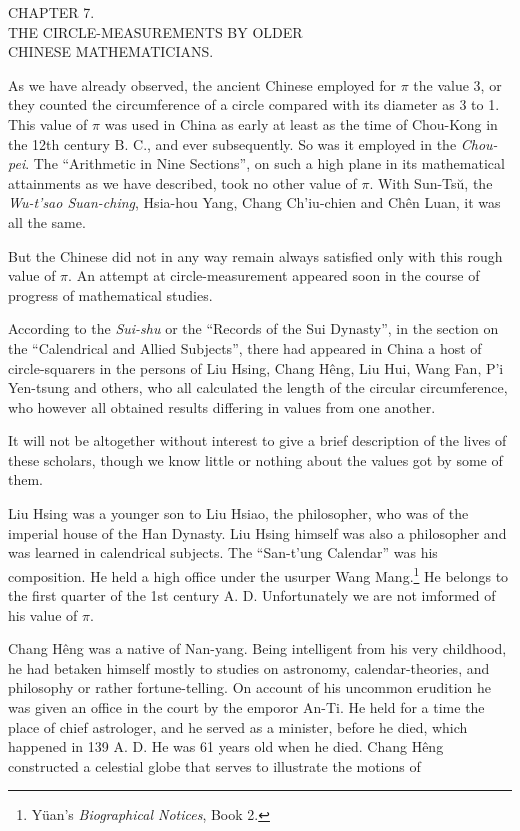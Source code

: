 \documentclass[11pt]{article}
\newcommand{\scanpage}[2]{\clearpage\setcounter{footnote}{0}\noindent{\footnotesize\color{gray}PDF page #1 · #2}\par\medskip}
\newcommand{\scanfooter}{}
\begin{document}
\scanpage{0060}{Chapter 7, printed page 46}
\setcounter{footnote}{0}
\begin{center}
CHAPTER 7.\\
THE CIRCLE-MEASUREMENTS BY OLDER\\
CHINESE MATHEMATICIANS.
\end{center}

As we have already observed, the ancient Chinese employed for $\pi$ the value 3, or they counted the circumference of a circle compared with its diameter as 3 to 1. This value of $\pi$ was used in China as early at least as the time of Chou-Kong in the 12th century B. C., and ever subsequently. So was it employed in the \emph{Chou-pei}. The ``Arithmetic in Nine Sections'', on such a high plane in its mathematical attainments as we have described, took no other value of $\pi$. With Sun-Tsŭ, the \emph{Wu-t'sao Suan-ching}, Hsia-hou Yang, Chang Ch'iu-chien and Chên Luan, it was all the same.

But the Chinese did not in any way remain always satisfied only with this rough value of $\pi$. An attempt at circle-measurement appeared soon in the course of progress of mathematical studies.

According to the \emph{Sui-shu} or the ``Records of the Sui Dynasty'', in the section on the ``Calendrical and Allied Subjects'', there had appeared in China a host of circle-squarers in the persons of Liu Hsing, Chang Hêng, Liu Hui, Wang Fan, P'i Yen-tsung and others, who all calculated the length of the circular circumference, who however all obtained results differing in values from one another.

It will not be altogether without interest to give a brief description of the lives of these scholars, though we know little or nothing about the values got by some of them.

Liu Hsing was a younger son to Liu Hsiao, the philosopher, who was of the imperial house of the Han Dynasty. Liu Hsing himself was also a philosopher and was learned in calendrical subjects. The ``San-t'ung Calendar'' was his composition. He held a high office under the usurper Wang Mang.\footnote{Yüan's \emph{Biographical Notices}, Book 2.} He belongs to the first quarter of the 1st century A. D. Unfortunately we are not imformed of his value of $\pi$.

Chang Hêng was a native of Nan-yang. Being intelligent from his very childhood, he had betaken himself mostly to studies on astronomy, calendar-theories, and philosophy or rather fortune-telling. On account of his uncommon erudition he was given an office in the court by the emporor An-Ti. He held for a time the place of chief astrologer, and he served as a minister, before he died, which happened in 139 A. D. He was 61 years old when he died. Chang Hêng constructed a celestial globe that serves to illustrate the motions of
\scanfooter
\end{document}

